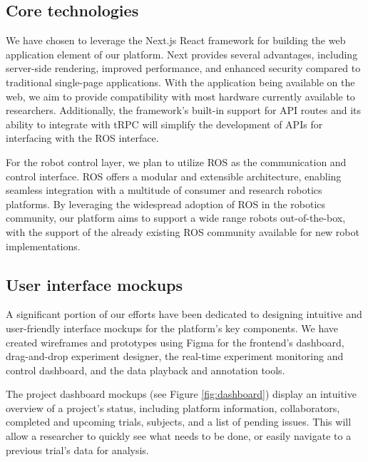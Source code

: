 \documentclass[letterpaper, 10 pt, conference]{ieeeconf}
\begin{document}
\subsection{Core technologies}

We have chosen to leverage the Next.js React framework for building the web application element of our platform. Next provides several advantages, including server-side rendering, improved performance, and enhanced security compared to traditional single-page applications. With the application being available on the web, we aim to provide compatibility with most hardware currently available to researchers. Additionally, the framework's built-in support for API routes and its ability to integrate with tRPC will simplify the development of APIs for interfacing with the ROS interface.

For the robot control layer, we plan to utilize ROS as the communication and control interface. ROS offers a modular and extensible architecture, enabling seamless integration with a multitude of consumer and research robotics platforms. By leveraging the widespread adoption of ROS in the robotics community, our platform aims to support a wide range robots out-of-the-box, with the support of the already existing ROS community available for new robot implementations.

\subsection{User interface mockups}

A significant portion of our efforts have been dedicated to designing intuitive and user-friendly interface mockups for the platform's key components. We have created wireframes and prototypes using Figma for the frontend's dashboard, drag-and-drop experiment designer, the real-time experiment monitoring and control dashboard, and the data playback and annotation tools.

The project dashboard mockups (see Figure \ref{fig:dashboard}) display an intuitive overview of a project's status, including platform information, collaborators, completed and upcoming trials, subjects, and a list of pending issues. This will allow a researcher to quickly see what needs to be done, or easily navigate to a previous trial's data for analysis.
\end{document}
